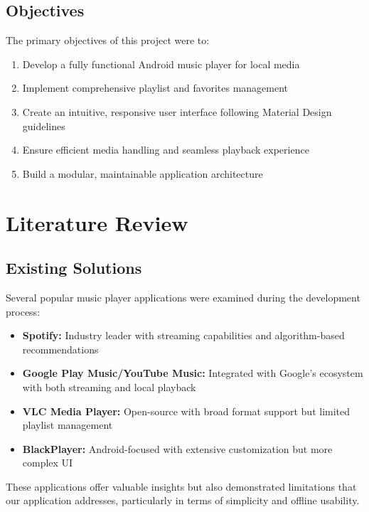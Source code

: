 \documentclass{article}
\begin{document}
\subsection{Objectives}
The primary objectives of this project were to:
\begin{enumerate}
    \item Develop a fully functional Android music player for local media
    \item Implement comprehensive playlist and favorites management
    \item Create an intuitive, responsive user interface following Material Design guidelines
    \item Ensure efficient media handling and seamless playback experience
    \item Build a modular, maintainable application architecture
\end{enumerate}

\section{Literature Review}
\subsection{Existing Solutions}
Several popular music player applications were examined during the development process:
\begin{itemize}
    \item \textbf{Spotify:} Industry leader with streaming capabilities and algorithm-based recommendations
    \item \textbf{Google Play Music/YouTube Music:} Integrated with Google's ecosystem with both streaming and local playback
    \item \textbf{VLC Media Player:} Open-source with broad format support but limited playlist management
    \item \textbf{BlackPlayer:} Android-focused with extensive customization but more complex UI
\end{itemize}

These applications offer valuable insights but also demonstrated limitations that our application addresses, particularly in terms of simplicity and offline usability.
\end{document}

